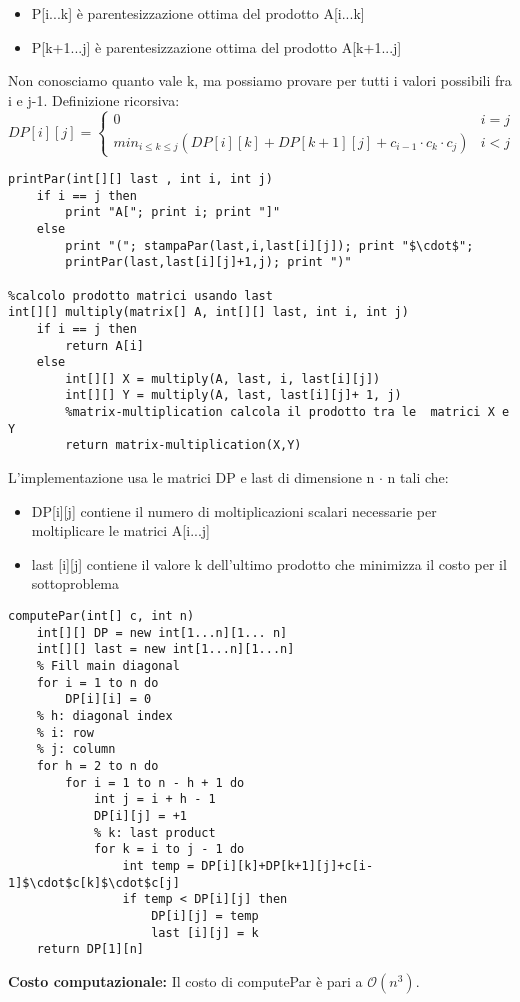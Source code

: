 \documentclass[../cheatSheetAlgoritmi.tex]{subfiles}
\begin{document}
\begin{itemize}
	\item P[i...k] è parentesizzazione ottima del prodotto A[i...k]
	\item P[k+1...j] è parentesizzazione ottima del prodotto A[k+1...j]
\end{itemize}
Non conosciamo quanto vale k, ma possiamo provare per tutti i valori possibili fra i e j-1.
Definizione ricorsiva:
\begin{equation*}
  	DP[i][j] =\begin{cases}
    	0 & \text{$i = j$}\\
    	min_{i \leq k \leq j}(DP[i][k]+DP[k+1][j]+c_{i-1} \cdot c_{k} \cdot c_{j})  & \text{$i < j$}  
  	\end{cases}
\end{equation*}
\newpage
\begin{lstlisting}[caption= Calcolo prodotto di matrici e stampa parentesizzazione ottima usando matrice last]
%ricostruzione della soluzione (stampa prodotto)
printPar(int[][] last , int i, int j)
	if i == j then
		print "A["; print i; print "]"
	else
		print "("; stampaPar(last,i,last[i][j]); print "$\cdot$";
		printPar(last,last[i][j]+1,j); print ")"

%calcolo prodotto matrici usando last 
int[][] multiply(matrix[] A, int[][] last, int i, int j)
	if i == j then
		return A[i]
	else
		int[][] X = multiply(A, last, i, last[i][j])
		int[][] Y = multiply(A, last, last[i][j]+ 1, j)
		%matrix-multiplication calcola il prodotto tra le  matrici X e Y
		return matrix-multiplication(X,Y)
\end{lstlisting}
\noindent
L'implementazione usa le matrici DP e last di dimensione n $\cdot$ n tali che:
\begin{itemize}
	\item DP[i][j] contiene il numero di moltiplicazioni scalari necessarie per moltiplicare le matrici A[i...j] 
	\item last [i][j] contiene il valore k dell'ultimo prodotto che minimizza il costo per il sottoproblema
\end{itemize}
\begin{lstlisting}[caption= Calcolo parentesizzazione ottima]
%calcolo della soluzione ottima
computePar(int[] c, int n)
	int[][] DP = new int[1...n][1... n]
	int[][] last = new int[1...n][1...n]
	% Fill main diagonal
	for i = 1 to n do 
		DP[i][i] = 0
	% h: diagonal index
	% i: row
	% j: column
	for h = 2 to n do
		for i = 1 to n - h + 1 do 
			int j = i + h - 1 
			DP[i][j] = +1
			% k: last product
			for k = i to j - 1 do 
				int temp = DP[i][k]+DP[k+1][j]+c[i-1]$\cdot$c[k]$\cdot$c[j]
				if temp < DP[i][j] then
					DP[i][j] = temp
					last [i][j] = k
	return DP[1][n]
\end{lstlisting}
\textbf{Costo computazionale:} Il costo di computePar è pari a $\mathcal{O}(n^{3})$.
\newpage
\end{document}
